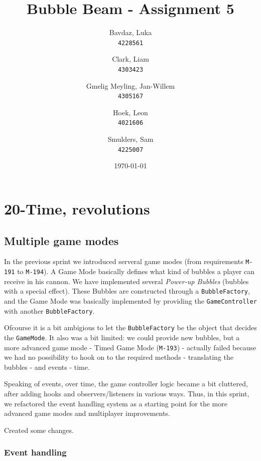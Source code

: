 \documentclass[a4paper]{article}
\title{Bubble Beam - Assignment 5}
\author{
    Bavdaz, Luka\\
    \texttt{4228561}
    \and
    Clark, Liam\\
    \texttt{4303423}
    \and
    Gmelig Meyling, Jan-Willem\\
    \texttt{4305167}
    \and
    Hoek, Leon\\
    \texttt{4021606}
    \and
    Smulders, Sam\\
    \texttt{4225007}
}
\date{\today}
\begin{document}
\maketitle



\section{20-Time, revolutions}

\subsection{Multiple game modes}
In the previous sprint we introduced serveral game modes (from requirements \texttt{M-191} to \texttt{M-194}). A Game Mode basically defines what kind of bubbles a player can receive in his cannon. We have implemented several \textit{Power-up Bubbles} (bubbles with a special effect). These Bubbles are constructed through a \texttt{BubbleFactory}, and the Game Mode was basically implemented by providing the \texttt{GameController} with another \texttt{BubbleFactory}.

\par{}Ofcourse it is a bit ambigious to let the \texttt{BubbleFactory} be the object that decides the \texttt{GameMode}. It also was a bit limited: we could provide new bubbles, but a more advanced game mode - Timed Game Mode (\texttt{M-193}) - actually failed because we had no possibility to hook on to the required methods - translating the bubbles - and events - time.

\par{}Speaking of events, over time, the game controller logic became a bit cluttered, after adding hooks and observers/listeners in various ways. Thus, in this sprint, we refactored the event handling system as a starting point for the more advanced game modes and multiplayer improvements.

Created some changes.

\subsubsection{Event handling}
\label{sec:evthdl}
\end{document}
